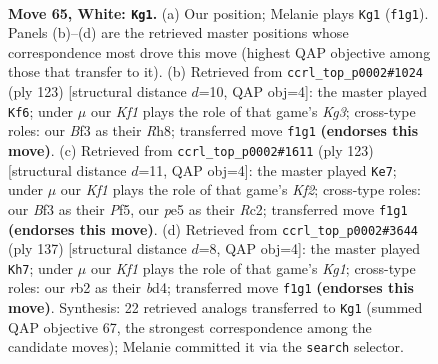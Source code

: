 \documentclass[11pt]{article}
\begin{document}
\clearpage

\begin{figure}[p]\centering
\begin{subfigure}{0.46\textwidth}\centering
\resizebox{\linewidth}{!}{%
\newchessgame
\chessboard[
  setfen={8/8/6k1/4p1p1/5p2/5B2/1r6/5K2 w - - 41 65},
  showmover=false,
  pgfstyle=straightmove, color=movearrow, markmove={f1-g1}
]}
\caption{}
\end{subfigure}\hfill
\begin{subfigure}{0.46\textwidth}\centering
\resizebox{\linewidth}{!}{%
\newchessgame
\chessboard[
  setfen={7r/3R4/6k1/8/5p2/5P2/6P1/6K1 b - - 8 62},
  showmover=false,
  pgfstyle=straightmove, color=movearrow, markmove={g6-f6}
]}
\caption{}
\end{subfigure}
\\[4pt]
\begin{subfigure}{0.46\textwidth}\centering
\resizebox{\linewidth}{!}{%
\newchessgame
\chessboard[
  setfen={8/5k2/1R6/5p2/5P2/6PK/2r5/8 b - - 0 62},
  showmover=false,
  pgfstyle=straightmove, color=movearrow, markmove={f7-e7}
]}
\caption{}
\end{subfigure}\hfill
\begin{subfigure}{0.46\textwidth}\centering
\resizebox{\linewidth}{!}{%
\newchessgame
\chessboard[
  setfen={6k1/8/8/7P/3B2P1/6K1/2b5/8 b - - 8 69},
  showmover=false,
  pgfstyle=straightmove, color=movearrow, markmove={g8-h7}
]}
\caption{}
\end{subfigure}
\caption{\textbf{Move 65, White: \texttt{Kg1}.} (a) Our position; Melanie plays \texttt{Kg1} (\texttt{f1g1}). Panels (b)--(d) are the retrieved master positions whose correspondence most drove this move (highest QAP objective among those that transfer to it). (b) Retrieved from \texttt{ccrl\_top\_p0002\#1024} (ply 123) [structural distance $d$=10, QAP obj=4]: the master played \texttt{Kf6}; under $\mu$ our \emph{Kf1} plays the role of that game's \emph{Kg3}; cross-type roles: our \emph{B}f3 as their \emph{R}h8; transferred move \texttt{f1g1} \textbf{(endorses this move)}. (c) Retrieved from \texttt{ccrl\_top\_p0002\#1611} (ply 123) [structural distance $d$=11, QAP obj=4]: the master played \texttt{Ke7}; under $\mu$ our \emph{Kf1} plays the role of that game's \emph{Kf2}; cross-type roles: our \emph{B}f3 as their \emph{P}f5, our \emph{p}e5 as their \emph{R}c2; transferred move \texttt{f1g1} \textbf{(endorses this move)}. (d) Retrieved from \texttt{ccrl\_top\_p0002\#3644} (ply 137) [structural distance $d$=8, QAP obj=4]: the master played \texttt{Kh7}; under $\mu$ our \emph{Kf1} plays the role of that game's \emph{Kg1}; cross-type roles: our \emph{r}b2 as their \emph{b}d4; transferred move \texttt{f1g1} \textbf{(endorses this move)}. Synthesis: 22 retrieved analogs transferred to \texttt{Kg1} (summed QAP objective 67, the strongest correspondence among the candidate moves); Melanie committed it via the \texttt{search} selector.}
\label{fig:thought-m128}
\end{figure}
\end{document}
